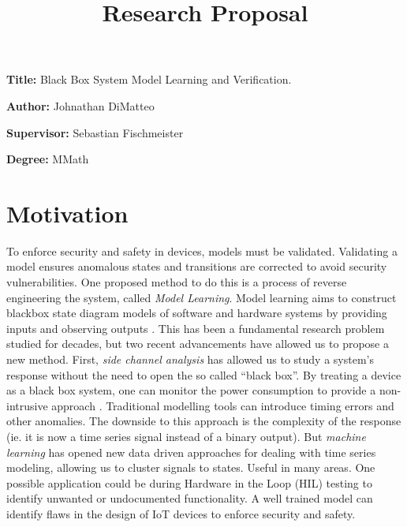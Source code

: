 \documentclass[11pt, a4paper]{article}
\title{Research Proposal}
\author{}
\date{}
\newcommand{\namelistlabel}[1]{\mbox{#1}\hfil}
\newenvironment{namelist}[1]{%
\begin{list}{}
    {
        \let\makelabel\namelistlabel
        \settowidth{\labelwidth}{#1}
        \setlength{\leftmargin}{1.1\labelwidth}
    }
  }{%
\end{list}}
\begin{document}
\maketitle

\begin{namelist}{xxxxxxxxxxxx}
\item[{\bf Title:}]
	Black Box System Model Learning and Verification.
\item[{\bf Author:}]
	Johnathan DiMatteo
\item[{\bf Supervisor:}]
	Sebastian Fischmeister
\item[{\bf Degree:}]
	MMath
\end{namelist}

\section*{Motivation} 


To enforce security and safety in devices, models must be validated.
Validating a model ensures anomalous states and transitions are corrected to avoid security vulnerabilities.
One proposed method to do this is a process of reverse engineering the system, called \textit{Model Learning}.
Model learning aims to construct blackbox state diagram models of software and hardware systems by providing inputs and observing outputs \cite{modellearning}.
This has been a fundamental research problem studied for decades, but two recent advancements have allowed us to propose a new method.
First, \textit{side channel analysis} has allowed us to study a system's response without the need to open the so called ``black box''.
By treating a device as a black box system, one can monitor the power consumption to provide a non-intrusive approach \cite{seb}.
Traditional modelling tools can introduce timing errors and other anomalies. 
The downside to this approach is the complexity of the response (ie. it is now a time series signal instead of a binary output).
But \textit{machine learning} has opened new data driven approaches for dealing with time series modeling, allowing us to cluster signals to states.
Useful in many areas.
One possible application could be during Hardware in the Loop (HIL) testing to identify unwanted or undocumented functionality.
A well trained model can identify flaws in the design of IoT devices to enforce security and safety.
\end{document}
